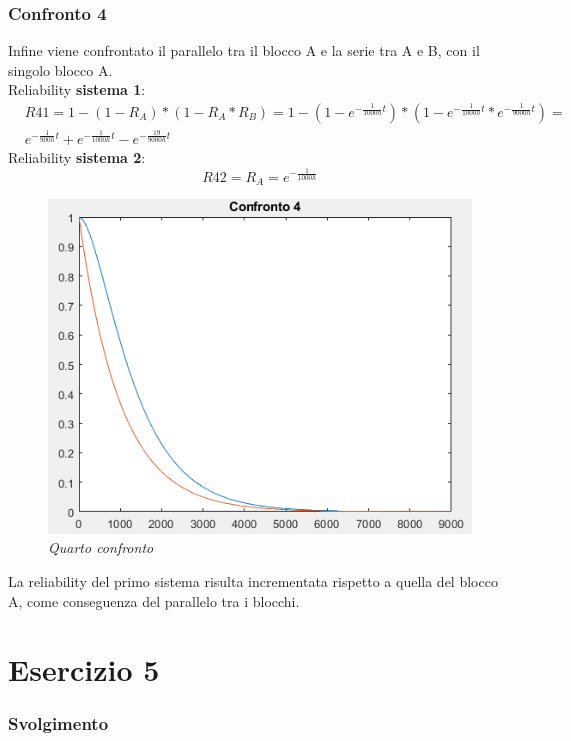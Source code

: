 \subsubsection{Confronto 4}
Infine viene confrontato il parallelo tra il blocco A e la serie tra A e B, con il singolo blocco A.
\\
Reliability \textbf{sistema 1}:
\begin{equation*}
	\begin{split}
		&R41 = 1-(1-R_A)*(1-R_A*R_B) = 1-(1-e^{-\frac{1}{1000h} t})*(1-e^{-\frac{1}{1000h} t}*e^{-\frac{1}{9000h} t}) = \\
		&e^{-\frac{1}{900h}t}+e^{-\frac{1}{1000h}t}-e^{-\frac{19}{9000h}t}
	\end{split}
\end{equation*}
Reliability \textbf{sistema 2}:
\begin{equation*}
	R42 = R_A = e^{-\frac{1}{1000h}}
\end{equation*}
\begin{figure}[H]
	\centering
	\includegraphics[width=\textwidth]{img/hw5/es4_4.png}
	\caption{\textit{Quarto confronto}}
\end{figure}
La reliability del primo sistema risulta incrementata rispetto a quella del blocco A, come conseguenza del parallelo tra i blocchi.
\section{Esercizio 5}
\subsubsection{Svolgimento}